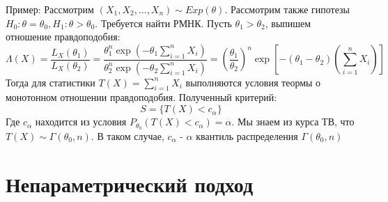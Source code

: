 \documentclass[a4paper,12pt]{article}
\newcommand{\sumin}{\sum\limits_{i=1}^n}
\newcommand{\sample}{X_1, X_2, ..., X_n}
\theoremstyle{named}
\begin{document}
Пример: Рассмотрим $(\sample) \sim Exp(\theta)$. Рассмотрим также гипотезы $H_0: \theta = \theta_0, H_1: \theta > \theta_0$.
Требуется найти РМНК. Пусть $\theta_1 > \theta_2$, выпишем отношение правдоподобия:
$$
    \Lambda(X) = \frac{L_X(\theta_1)}{L_X(\theta_2)} = \frac{\theta_1^n \exp(-\theta_1 \sumin X_i)}{\theta_2^n \exp(-\theta_2 \sumin X_i)} =
    \left(\frac{\theta_1}{\theta_2}\right)^n \exp\left[-(\theta_1 - \theta_2)\left(\sumin X_i\right)\right]
$$
Тогда для статистики $T(X) = \sumin X_i$ выполняются условия теормы о монотонном отношении правдоподобия. Полученный критерий:
$$
    S = \{T(X) < c_\alpha \}
$$
Где $c_\alpha$ находится из условия $P_{\theta_0}(T(X) < c_\alpha) = \alpha$. Мы знаем из курса ТВ, что $T(X) \sim \Gamma(\theta_0, n)$. 
В таком случае, $c_\alpha$ - $\alpha$ квантиль распределения $\Gamma(\theta_0, n)$

\section{Непараметрический подход}
\end{document}
